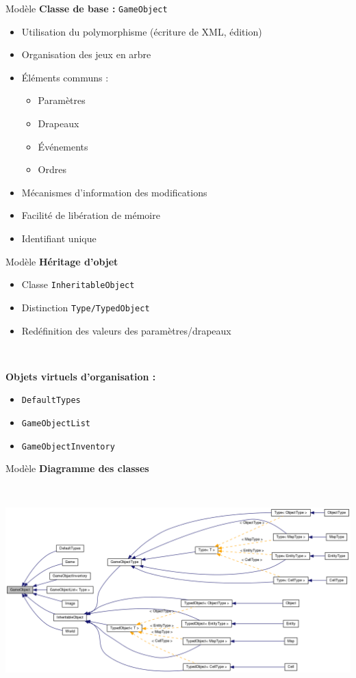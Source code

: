 \documentclass[11pt]{beamer}
\begin{document}
\begin{frame}{Modèle}
	\textbf{Classe de base : } \texttt{GameObject} 
	\begin{itemize}
		\item Utilisation du polymorphisme (écriture de XML, édition)
		\item Organisation des jeux en arbre
		\item Éléments communs : 
		\begin{itemize}
			\item Paramètres
			\item Drapeaux
			\item Événements
			\item Ordres
		\end{itemize}
		\item Mécanismes d'information des modifications
		\item Facilité de libération de mémoire
		\item Identifiant unique
	\end{itemize}
\end{frame}

\begin{frame}{Modèle}
	\textbf{Héritage d'objet}
	\begin{itemize}
		\item Classe \texttt{InheritableObject}
		\item Distinction \texttt{Type/TypedObject}
		\item Redéfinition des valeurs des paramètres/drapeaux
	\end{itemize}
	
	~
	
	\textbf{Objets virtuels d'organisation :}
	\begin{itemize}
		\item \texttt{DefaultTypes}
		\item \texttt{GameObjectList}
		\item \texttt{GameObjectInventory}
	\end{itemize}
\end{frame}


\begin{frame}{Modèle}
	\textbf{Diagramme des classes}
	
	~
	
	\begin{center}
		\includegraphics[scale=.24]{GameObject.png}
	\end{center}
\end{frame}
\end{document}

